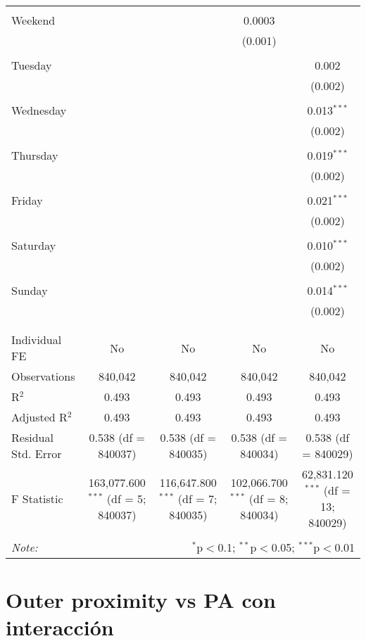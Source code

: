 \documentclass[
]{article}
\begin{document}
\begin{table}[!htbp]
{\begin{tabular}{@{\extracolsep{5pt}}lcccc}
  & & & & \\ 
 Weekend &  &  & 0.0003 &  \\ 
  &  &  & (0.001) &  \\ 
  & & & & \\ 
 Tuesday &  &  &  & 0.002 \\ 
  &  &  &  & (0.002) \\ 
  & & & & \\ 
 Wednesday &  &  &  & 0.013$^{***}$ \\ 
  &  &  &  & (0.002) \\ 
  & & & & \\ 
 Thursday &  &  &  & 0.019$^{***}$ \\ 
  &  &  &  & (0.002) \\ 
  & & & & \\ 
 Friday &  &  &  & 0.021$^{***}$ \\ 
  &  &  &  & (0.002) \\ 
  & & & & \\ 
 Saturday &  &  &  & 0.010$^{***}$ \\ 
  &  &  &  & (0.002) \\ 
  & & & & \\ 
 Sunday &  &  &  & 0.014$^{***}$ \\ 
  &  &  &  & (0.002) \\ 
  & & & & \\ 
\hline \\[-1.8ex] 
Individual FE & No & No & No & No \\ 
Observations & 840,042 & 840,042 & 840,042 & 840,042 \\ 
R$^{2}$ & 0.493 & 0.493 & 0.493 & 0.493 \\ 
Adjusted R$^{2}$ & 0.493 & 0.493 & 0.493 & 0.493 \\ 
Residual Std. Error & 0.538 (df = 840037) & 0.538 (df = 840035) & 0.538 (df = 840034) & 0.538 (df = 840029) \\ 
F Statistic & 163,077.600$^{***}$ (df = 5; 840037) & 116,647.800$^{***}$ (df = 7; 840035) & 102,066.700$^{***}$ (df = 8; 840034) & 62,831.120$^{***}$ (df = 13; 840029) \\ 
\hline 
\hline \\[-1.8ex] 
\textit{Note:}  & \multicolumn{4}{r}{$^{*}$p$<$0.1; $^{**}$p$<$0.05; $^{***}$p$<$0.01} \\ 
\end{tabular}
} 
\end{table} 
\newpage
\section{Outer proximity vs PA con interacción}
\end{document}
